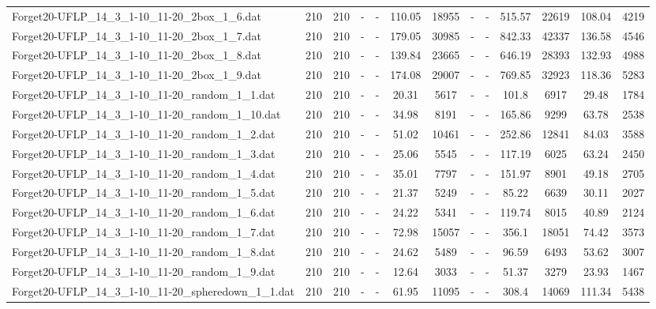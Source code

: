 \begin{table}[!ht]
{\begin{tabular}{lcccccccccccc}
Forget20-UFLP\_14\_3\_1-10\_11-20\_2box\_1\_6.dat & 210 & 210 &  - &  - & 110.05 & 18955 &  - &  - & 515.57 & 22619 & 108.04 & 4219 \\
Forget20-UFLP\_14\_3\_1-10\_11-20\_2box\_1\_7.dat & 210 & 210 &  - &  - & 179.05 & 30985 &  - &  - & 842.33 & 42337 & 136.58 & 4546 \\
Forget20-UFLP\_14\_3\_1-10\_11-20\_2box\_1\_8.dat & 210 & 210 &  - &  - & 139.84 & 23665 &  - &  - & 646.19 & 28393 & 132.93 & 4988 \\
Forget20-UFLP\_14\_3\_1-10\_11-20\_2box\_1\_9.dat & 210 & 210 &  - &  - & 174.08 & 29007 &  - &  - & 769.85 & 32923 & 118.36 & 5283 \\
Forget20-UFLP\_14\_3\_1-10\_11-20\_random\_1\_1.dat & 210 & 210 &  - &  - & 20.31 & 5617 &  - &  - & 101.8 & 6917 & 29.48 & 1784 \\
Forget20-UFLP\_14\_3\_1-10\_11-20\_random\_1\_10.dat & 210 & 210 &  - &  - & 34.98 & 8191 &  - &  - & 165.86 & 9299 & 63.78 & 2538 \\
Forget20-UFLP\_14\_3\_1-10\_11-20\_random\_1\_2.dat & 210 & 210 &  - &  - & 51.02 & 10461 &  - &  - & 252.86 & 12841 & 84.03 & 3588 \\
Forget20-UFLP\_14\_3\_1-10\_11-20\_random\_1\_3.dat & 210 & 210 &  - &  - & 25.06 & 5545 &  - &  - & 117.19 & 6025 & 63.24 & 2450 \\
Forget20-UFLP\_14\_3\_1-10\_11-20\_random\_1\_4.dat & 210 & 210 &  - &  - & 35.01 & 7797 &  - &  - & 151.97 & 8901 & 49.18 & 2705 \\
Forget20-UFLP\_14\_3\_1-10\_11-20\_random\_1\_5.dat & 210 & 210 &  - &  - & 21.37 & 5249 &  - &  - & 85.22 & 6639 & 30.11 & 2027 \\
Forget20-UFLP\_14\_3\_1-10\_11-20\_random\_1\_6.dat & 210 & 210 &  - &  - & 24.22 & 5341 &  - &  - & 119.74 & 8015 & 40.89 & 2124 \\
Forget20-UFLP\_14\_3\_1-10\_11-20\_random\_1\_7.dat & 210 & 210 &  - &  - & 72.98 & 15057 &  - &  - & 356.1 & 18051 & 74.42 & 3573 \\
Forget20-UFLP\_14\_3\_1-10\_11-20\_random\_1\_8.dat & 210 & 210 &  - &  - & 24.62 & 5489 &  - &  - & 96.59 & 6493 & 53.62 & 3007 \\
Forget20-UFLP\_14\_3\_1-10\_11-20\_random\_1\_9.dat & 210 & 210 &  - &  - & 12.64 & 3033 &  - &  - & 51.37 & 3279 & 23.93 & 1467 \\
Forget20-UFLP\_14\_3\_1-10\_11-20\_spheredown\_1\_1.dat & 210 & 210 &  - &  - & 61.95 & 11095 &  - &  - & 308.4 & 14069 & 111.34 & 5438 \\

\end{tabular}}
\end{table}
